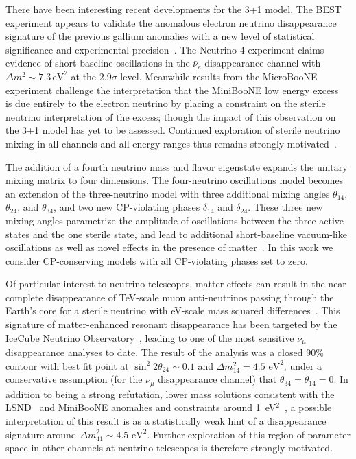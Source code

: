\documentclass[main.tex]{subfiles}
\begin{document}
There have been interesting recent developments for the 3+1 model.  
The BEST experiment appears to validate the anomalous electron neutrino disappearance signature of the previous gallium anomalies with a new level of statistical significance and experimental precision~\cite{barinov2021results}. 
The Neutrino-4 experiment claims evidence of short-baseline oscillations in the $\bar{\nu}_e$ disappearance channel with $\Delta m^2\sim 7.3\,\mathrm{eV}^2$ at the 2.9$\sigma$ level.
 Meanwhile results from the MicroBooNE~\cite{microboonecollaboration2021search,microboonecollaboration2021search1,microboonecollaboration2021searchmulti} experiment challenge the interpretation that the MiniBooNE low energy excess~\cite{miniboone2018} is due entirely to the electron neutrino by placing a constraint on the sterile neutrino interpretation of the excess; though the impact of this observation on the 3+1 model has yet to be assessed.  Continued exploration of sterile neutrino mixing in all channels and all energy ranges thus remains strongly motivated~\cite{sbnfermilab}.

The addition of a fourth neutrino mass and flavor eigenstate expands the unitary mixing matrix to four dimensions. 
The four-neutrino oscillations model becomes an extension of the three-neutrino model with three additional mixing angles $\theta_{14}$, $\theta_{24}$, and $\theta_{34}$, and two new CP-violating phases $\delta_{14}$ and $\delta_{24}$. These three new mixing angles parametrize the amplitude of oscillations between the three active states and the one sterile state, and lead to additional short-baseline vacuum-like oscillations as well as novel effects in the presence of matter~\cite{Akhmedov:1988kd,KRASTEV1989341,Chizhov:1998ug, Chizhov_1999, Akhmedov_2000, Nunokawa:2003ep,Petcov:2016iiu}.  In this work we consider CP-conserving models with all CP-violating phases set to zero.

Of particular interest to neutrino telescopes, matter effects can result in the near complete disappearance of TeV-scale muon anti-neutrinos passing through the Earth's core for a sterile neutrino with eV-scale mass squared differences~\cite{Nunokawa:2003ep, Choubey:2007ji, Barger:2011rc, Esmaili:2012nz, esmaili2013restricting, Lindner:2015iaa}. This signature of matter-enhanced resonant disappearance has been targeted by the IceCube Neutrino Observatory~\cite{Aartsen_2020, Aartsen_2020_prd}, leading to one of the  most sensitive $\nu_\mu$ disappearance analyses to date. The result of the analysis was a closed 90\% contour with best fit point at $\sin^2 2\theta_{24}\sim0.1$ and $\Delta m^2_{14}=4.5\text{ eV}^2$, under a conservative assumption (for the $\nu_\mu$ disappearance channel) that $\theta_{34}=\theta_{14}=0$. In addition to being a strong refutation, lower mass solutions consistent with the LSND~\cite{Athanassopoulos_1998} and MiniBooNE anomalies and constraints around 1~eV$^2$~\cite{kopp2013sterile, Cirelli:2004cz, abazajian2012light, Gariazzo:2017fdh, Dentler:2017tkw, Diaz:2019fwt}, a possible interpretation of this result is as a statistically weak hint of a disappearance signature around $\Delta m^2_{41}\sim4.5\text{ eV}^2$.  Further exploration of this region of parameter space  in other channels at neutrino telescopes is therefore strongly motivated. 
\end{document}
